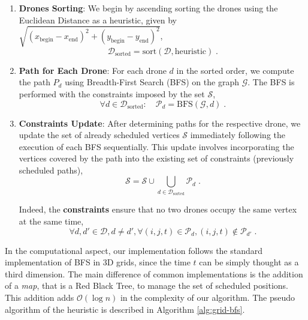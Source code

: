 \begin{enumerate}

   \item \textbf{Drones Sorting}: We begin by ascending sorting the drones using the Euclidean Distance as a heuristic, given by \( \sqrt{(x_{\text{begin}} - x_{\text{end}})^2 + (y_{\text{begin}} - y_{\text{end}})^2} \), \begin{equation}
        \mathcal{D}_{\text{sorted}} = \text{sort}(\mathcal{D}, \text{heuristic}) \; \text{.}
    \end{equation}
    
\item \textbf{Path for Each Drone}: For each drone \(d\) in the sorted order, we compute the path \(P_d\) using Breadth-First Search (BFS) on the graph \(\mathcal{G}\). The BFS is performed with the constraints imposed by the set \(\mathcal{S}\), \begin{equation}
        \forall d \in \mathcal{D}_{\text{sorted}}: \quad \mathcal{P}_d = \text{BFS}(\mathcal{G}, d) \; \text{.}
    \end{equation}
    
    \item \textbf{Constraints Update}: After determining paths for the respective drone, we update the set of already scheduled vertices \(\mathcal{S}\) immediately following the execution of each BFS sequentially. This update involves incorporating the vertices covered by the path into the existing set of constraints (previously scheduled paths), \begin{equation}
        \mathcal{S} = \mathcal{S} \cup \bigcup_{d \in \mathcal{D}_{\text{sorted}}} \mathcal{P}_d \; \text{.}
    \end{equation}

   Indeed, the \textbf{constraints} ensure that no two drones occupy the same vertex at the same time, \begin{equation}
    \forall d, d' \in \mathcal{D}, d \neq d', \forall (i, j, t) \in \mathcal{P}_d, (i, j, t) \notin \mathcal{P}_{d'} \; \text{.}
\end{equation}

    
\end{enumerate}

In the computational aspect, our implementation follows the standard implementation of BFS in 3D grids, since the time $t$ can be simply thought as a third dimension. The main difference of common implementations is the addition of a \textit{map}, that is a Red Black Tree, to manage the set of scheduled positions. This addition adds $\mathcal{O}(\log n)$ in the complexity of our algorithm. The pseudo algorithm of the heuristic is described in Algorithm \ref{alg:grid-bfs}.


